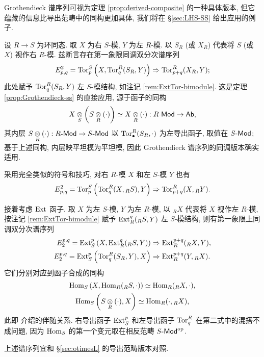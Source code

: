 Grothendieck 谱序列可视为定理 \ref{prop:derived-composite} 的一种具体版本, 但它蕴藏的信息比导出范畴中的同构更加具体, 我们将在 \S\ref{sec:LHS-SS} 给出应用的例子.

\begin{example}[环变换]\label{eg:change-of-rings-SS}
	设 $R \to S$ 为环同态. 取 $X$ 为右 $S$-模, $Y$ 为左 $R$-模. 以 $S_R$ (或 $X_R$) 代表将 $S$ (或 $X$) 视作右 $R$-模. 兹断言存在第一象限同调双分次谱序列
	\begin{gather*}
		E^2_{p,q} = \operatorname{Tor}^S_p\left( X, \operatorname{Tor}^R_q(S_R, Y) \right) \Rightarrow \operatorname{Tor}^R_{p+q}(X_R, Y);
	\end{gather*}
	此处赋予 $\operatorname{Tor}^R_q(S_R, Y)$ 左 $S$-模结构, 如注记 \ref{rem:ExtTor-bimodule}. 这是定理 \ref{prop:Grothendieck-ss} 的直接应用, 源于函子的同构
	\[ X \underset{S}{\otimes} \left( S \underset{R}{\otimes} (\cdot) \right) \simeq X \underset{R}{\otimes} (\cdot) : R\text{-}\mathsf{Mod} \to \mathsf{Ab}, \]
	其内层 $S \underset{R}{\otimes} (\cdot): R\text{-}\mathsf{Mod} \to S\text{-}\mathsf{Mod}$ 以 $\operatorname{Tor}^R_\bullet(S_R, \cdot)$ 为左导出函子, 取值在 $S\text{-}\mathsf{Mod}$; 基于上述同构, 内层映平坦模为平坦模, 因此 Grothendieck 谱序列的同调版本确实适用.

	采用完全类似的符号和技巧, 对右 $R$-模 $X$ 和左 $S$-模 $Y$ 也有
	\[ E^2_{p,q} = \operatorname{Tor}^S_p\left( \operatorname{Tor}^R_q(X, {}_R S), Y \right) \Rightarrow \operatorname{Tor}^R_{p+q}(X, {}_R Y). \]
	
	接着考虑 $\operatorname{Ext}$ 函子. 取 $X$ 为左 $S$-模, $Y$ 为左 $R$-模, 以 ${}_R X$ 代表将 $X$ 视作左 $R$-模, 按注记 \ref{rem:ExtTor-bimodule} 赋予 $\operatorname{Ext}^q_R({}_R S, Y)$ 左 $S$-模结构, 则有第一象限上同调双分次谱序列
	\begin{align*}
		E_2^{p,q} = \operatorname{Ext}_S^p\left( X, \operatorname{Ext}_R^q({}_R S, Y) \right) & \Rightarrow \operatorname{Ext}_R^{p+q}({}_R X, Y), \\
		E_2^{p,q} = \operatorname{Ext}_S^p\left( \operatorname{Tor}^R_q(S_R, Y), X \right) & \Rightarrow \operatorname{Ext}_R^{p+q}(Y, {}_R X).
	\end{align*}
	它们分别对应到函子合成的同构
	\begin{gather*}
		\operatorname{Hom}_S\left( X, \operatorname{Hom}_R({}_R S, \cdot) \right) \simeq \operatorname{Hom}_R({}_R X, \cdot), \\
		\operatorname{Hom}_S\left( S \underset{R}{\otimes} (\cdot), X \right) \simeq \operatorname{Hom}_R(\cdot, {}_R X),
	\end{gather*}
	此即 \cite[推论 6.6.8]{Li1} 介绍的伴随关系. 右导出函子 $\operatorname{Ext}_S^p$ 和左导出函子 $\operatorname{Tor}^R_q$ 在第二式中的混搭不成问题, 因为 $\operatorname{Hom}_S$ 的第一个变元取在相反范畴 $S\text{-}\mathsf{Mod}^{\operatorname{op}}$.
\end{example}

上述谱序列宜和 \S\ref{sec:otimesL} 的导出范畴版本对照.

